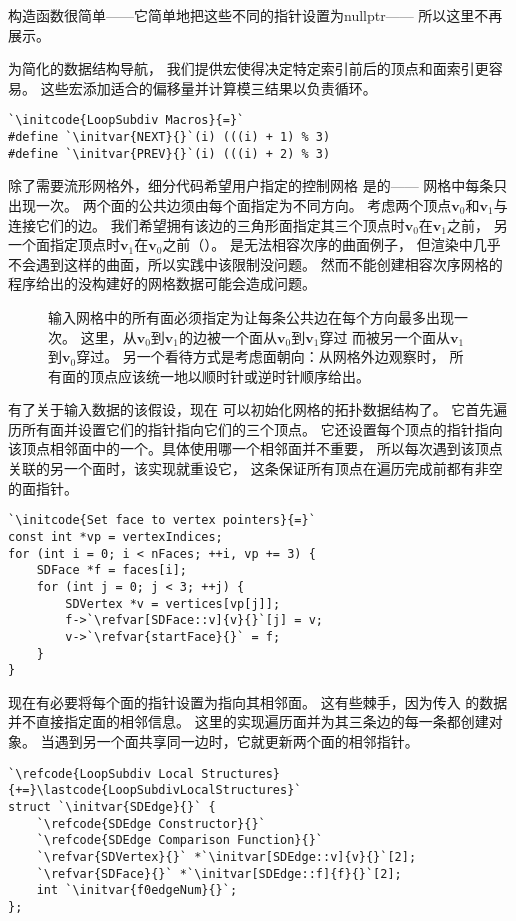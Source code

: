 构造函数很简单——它简单地把这些不同的指针设置为{\ttfamily nullptr}——
所以这里不再展示。

为简化的数据结构导航，
我们提供宏使得决定特定索引前后的顶点和面索引更容易。
这些宏添加适合的偏移量并计算模三结果以负责循环。
\begin{lstlisting}
`\initcode{LoopSubdiv Macros}{=}`
#define `\initvar{NEXT}{}`(i) (((i) + 1) % 3)
#define `\initvar{PREV}{}`(i) (((i) + 2) % 3)
\end{lstlisting}

除了需要流形网格外，细分代码希望用户指定的控制网格
是的——
网格中每条只出现一次。
两个面的公共边须由每个面指定为不同方向。
考虑两个顶点$\bm v_0$和$\bm v_1$与连接它们的边。
我们希望拥有该边的三角形面指定其三个顶点时$\bm v_0$在$\bm v_1$之前，
另一个面指定顶点时$\bm v_1$在$\bm v_0$之前（）。
是无法相容次序的曲面例子，
但渲染中几乎不会遇到这样的曲面，所以实践中该限制没问题。
然而不能创建相容次序网格的程序给出的没构建好的网格数据可能会造成问题。
\begin{figure}[htbp]
    \centering
    \caption{输入网格中的所有面必须指定为让每条公共边在每个方向最多出现一次。
        这里，从$\bm v_0$到$\bm v_1$的边被一个面从$\bm v_0$到$\bm v_1$穿过
        而被另一个面从$\bm v_1$到$\bm v_0$穿过。
        另一个看待方式是考虑面朝向：从网格外边观察时，
        所有面的顶点应该统一地以顺时针或逆时针顺序给出。}
    \label{fig:3.28}
\end{figure}

有了关于输入数据的该假设，现在
可以初始化网格的拓扑数据结构了。
它首先遍历所有面并设置它们的指针指向它们的三个顶点。
它还设置每个顶点的指针指向
该顶点相邻面中的一个。具体使用哪一个相邻面并不重要，
所以每次遇到该顶点关联的另一个面时，该实现就重设它，
这条保证所有顶点在遍历完成前都有非空的面指针。
\begin{lstlisting}
`\initcode{Set face to vertex pointers}{=}`
const int *vp = vertexIndices;
for (int i = 0; i < nFaces; ++i, vp += 3) {
    SDFace *f = faces[i];
    for (int j = 0; j < 3; ++j) {
        SDVertex *v = vertices[vp[j]];
        f->`\refvar[SDFace::v]{v}{}`[j] = v;
        v->`\refvar{startFace}{}` = f;
    }
}
\end{lstlisting}

现在有必要将每个面的指针设置为指向其相邻面。
这有些棘手，因为传入
的数据并不直接指定面的相邻信息。
这里的实现遍历面并为其三条边的每一条都创建对象。
当遇到另一个面共享同一边时，它就更新两个面的相邻指针。
\begin{lstlisting}
`\refcode{LoopSubdiv Local Structures}{+=}\lastcode{LoopSubdivLocalStructures}`
struct `\initvar{SDEdge}{}` {
    `\refcode{SDEdge Constructor}{}`
    `\refcode{SDEdge Comparison Function}{}`
    `\refvar{SDVertex}{}` *`\initvar[SDEdge::v]{v}{}`[2];
    `\refvar{SDFace}{}` *`\initvar[SDEdge::f]{f}{}`[2];
    int `\initvar{f0edgeNum}{}`;
};
\end{lstlisting}

